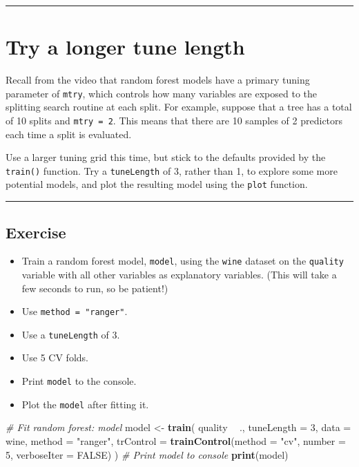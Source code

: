 \documentclass[]{book}
\newenvironment{Shaded}{\begin{snugshade}}{\end{snugshade}}
\newcommand{\KeywordTok}[1]{\textcolor[rgb]{0.13,0.29,0.53}{\textbf{#1}}}
\newcommand{\DataTypeTok}[1]{\textcolor[rgb]{0.13,0.29,0.53}{#1}}
\newcommand{\DecValTok}[1]{\textcolor[rgb]{0.00,0.00,0.81}{#1}}
\newcommand{\StringTok}[1]{\textcolor[rgb]{0.31,0.60,0.02}{#1}}
\newcommand{\CommentTok}[1]{\textcolor[rgb]{0.56,0.35,0.01}{\textit{#1}}}
\newcommand{\OtherTok}[1]{\textcolor[rgb]{0.56,0.35,0.01}{#1}}
\newcommand{\OperatorTok}[1]{\textcolor[rgb]{0.81,0.36,0.00}{\textbf{#1}}}
\newcommand{\NormalTok}[1]{#1}
\begin{document}
\begin{center}\rule{0.5\linewidth}{\linethickness}\end{center}

\section{Try a longer tune length}\label{try-a-longer-tune-length}

Recall from the video that random forest models have a primary tuning
parameter of \texttt{mtry}, which controls how many variables are
exposed to the splitting search routine at each split. For example,
suppose that a tree has a total of 10 splits and \texttt{mtry\ =\ 2}.
This means that there are 10 samples of 2 predictors each time a split
is evaluated.

Use a larger tuning grid this time, but stick to the defaults provided
by the \texttt{train()} function. Try a \texttt{tuneLength} of 3, rather
than 1, to explore some more potential models, and plot the resulting
model using the \texttt{plot} function.

\begin{center}\rule{0.5\linewidth}{\linethickness}\end{center}

\subsection*{Exercise}\label{exercise-18}

\begin{itemize}
\item
  Train a random forest model, \texttt{model}, using the \texttt{wine}
  dataset on the \texttt{quality} variable with all other variables as
  explanatory variables. (This will take a few seconds to run, so be
  patient!)
\item
  Use \texttt{method\ =\ "ranger"}.
\item
  Use a \texttt{tuneLength} of 3.
\item
  Use 5 CV folds.
\item
  Print \texttt{model} to the console.
\item
  Plot the \texttt{model} after fitting it.
\end{itemize}

\begin{Shaded}
\begin{Highlighting}[]
\CommentTok{# Fit random forest: model}
\NormalTok{model <-}\StringTok{ }\KeywordTok{train}\NormalTok{(}
\NormalTok{  quality }\OperatorTok{~}\StringTok{ }\NormalTok{.,}
  \DataTypeTok{tuneLength =} \DecValTok{3}\NormalTok{,}
  \DataTypeTok{data =}\NormalTok{ wine, }\DataTypeTok{method =} \StringTok{"ranger"}\NormalTok{,}
  \DataTypeTok{trControl =} \KeywordTok{trainControl}\NormalTok{(}\DataTypeTok{method =} \StringTok{"cv"}\NormalTok{, }\DataTypeTok{number =} \DecValTok{5}\NormalTok{, }\DataTypeTok{verboseIter =} \OtherTok{FALSE}\NormalTok{)}
\NormalTok{)}
\CommentTok{# Print model to console}
\KeywordTok{print}\NormalTok{(model)}
\end{Highlighting}
\end{Shaded}
\end{document}

